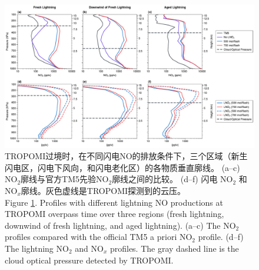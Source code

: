 \begin{figure}[htbp]
    \includegraphics[width=17cm]{./figures/nox_profile.pdf}
    \caption{
    TROPOMI过境时，在不同闪电NO的排放条件下，三个区域（新生闪电区，闪电下风向，和闪电老化区）的各物质垂直廓线。
     (a--c) NO$_2$廓线与官方TM5先验NO$_2$廓线之间的比较。
     (d--f) 闪电 NO$_2$ 和 NO$_x$廓线。灰色虚线是TROPOMI探测到的云压。\\
     Figure \ref{fig:nox_profile}. Profiles with different lightning NO productions at TROPOMI overpass time over three regions (fresh lightning, downwind of fresh lightning, and aged lightning).
    (a--c) The NO$_2$ profiles compared with the official TM5 a priori NO$_2$ profile.
    (d--f) The lightning NO$_2$ and NO$_x$ profiles.
    The gray dashed line is the cloud optical pressure detected by TROPOMI.
    }
    \label{fig:nox_profile}
\end{figure}


